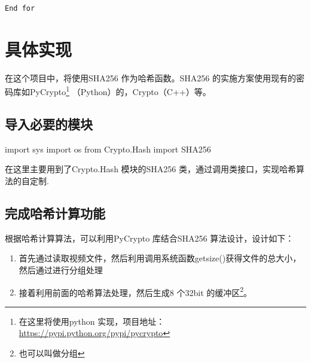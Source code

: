 \documentclass[hyperref,]{ctexart}
\newenvironment{Shaded}{\begin{snugshade}}{\end{snugshade}}
\newcommand{\ImportTok}[1]{#1}
\newcommand{\NormalTok}[1]{#1}
\begin{document}
\begin{verbatim}
End for
\end{verbatim}

\section{具体实现}

在这个项目中，将使用SHA256 作为哈希函数。SHA256
的实施方案使用现有的密码库如PyCrypto\footnote{在这里将使用python
  实现，项目地址：\url{https://pypi.python.org/pypi/pycrypto}}
（Python）的，Crypto（C++）等。

\subsection{导入必要的模块}

\begin{Shaded}
\begin{Highlighting}[]
\ImportTok{import}\NormalTok{ sys}
\ImportTok{import}\NormalTok{ os}
\ImportTok{from}\NormalTok{ Crypto.Hash }\ImportTok{import}\NormalTok{ SHA256}
\end{Highlighting}
\end{Shaded}

在这里主要用到了Crypto.Hash 模块的SHA256
类，通过调用类接口，实现哈希算法的自定制.

\subsection{完成哈希计算功能}

根据哈希计算算法，可以利用PyCrypto 库结合SHA256 算法设计，设计如下：

\begin{enumerate}
\def\labelenumi{\arabic{enumi}.}
\item
  首先通过读取视频文件，然后利用调用系统函数getsize()获得文件的总大小，然后通过进行分组处理
\item
  接着利用前面的哈希算法处理，然后生成8 个32bit 的缓冲区\footnote{也可以叫做分组}。
\end{enumerate}
\end{document}
